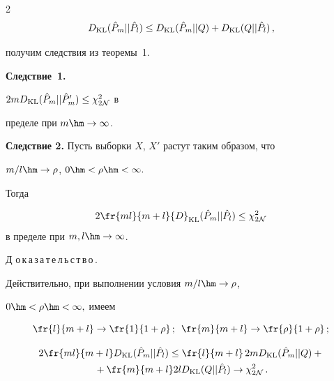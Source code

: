 \begin{multicols}{2}
$$

D_{\KL}(\hat{P}_m||\hat{P}_l)  \leq D_{\KL}(\hat{P}_m||Q)

+ D_{\KL}(Q||\hat{P}_l)\,,

$$

получим следствия из теоремы~1.



\smallskip



\noindent

\textbf{Следствие~1.}

$ 2m{D}_{\mathrm{KL}}(\hat{P}_m||\hat{P}'_m)  \leq \chi^2_{2\mathcal{N}}$ в

пределе при $m\hm\rightarrow\infty$. \\



\smallskip



\noindent

\textbf{Следствие 2.} Пусть выборки $X$, $X'$ растут таким образом, что

$ {m}/{l} \hm\rightarrow \rho$,  $0 \hm< \rho \hm< \infty.$

Тогда

$$

2\fr{ml}{m+l}{D}_{\KL}(\hat{P}_m||\hat{P}_l)  \leq \chi^2_{2\mathcal{N}}

$$ в пределе при $m, l\hm\rightarrow\infty$.



\smallskip



\noindent

Д\,\,о\,к\,а\,з\,а\,т\,е\,л\,ь\,с\,т\,в\,о\,.\ \

Действительно, при выполнении условия  $ {m}/{l} \hm\rightarrow \rho$,

$0 \hm< \rho \hm< \infty,$ имеем

 $$

 \fr{l}{m+l} \rightarrow \fr{1}{1 + \rho}\,;\enskip

 \fr{m}{m+l} \rightarrow \fr{\rho}{1 + \rho}\,;

 $$

\begin{multline*}

2\fr{ml}{m+l}D_{\KL}(\hat{P}_m||\hat{P}_l)  \leq \fr{l}{m+l}\,2mD_{\KL}(\hat{P}_m||Q)  + {}\\

{}+

\fr{m}{m+l}2lD_{\KL}(Q||\hat{P}_l) \rightarrow \chi^2_{2\mathcal{N}}\,.


\end{multline*}
\end{multicols}
